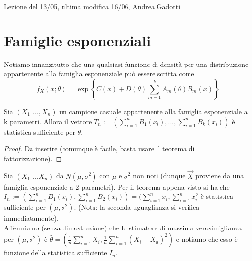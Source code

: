 
Lezione del 13/05, ultima modifica 16/06, Andrea Gadotti

\section{Famiglie esponenziali}

Notiamo innanzitutto che una qualsiasi funzione di densità per una distribuzione appartenente alla famiglia esponenziale può essere scritta come
$$f_X(x;\theta) = \exp \left\lbrace C(x) + D(\theta) \displaystyle \sum_{m=1}^k A_m(\theta) B_m(x) \right\rbrace$$

\begin{teo}

Sia $(X_1,...,X_n)$ un campione casuale appartenente alla famiglia esponenziale a k parametri. Allora il vettore $T_n:=(\sum_{i=1}^n B_1(x_i),...,\sum_{i=1}^n B_k(x_i))$ è statistica sufficiente per $\theta$.

\begin{proof}
Da inserire (comunque è facile, basta usare il teorema di fattorizzazione).
\end{proof}

\end{teo}

\begin{esempio}
Sia $(X_1,...X_n)$ da $N(\mu, \sigma^2)$ con $\mu$ e $\sigma^2$ non noti (dunque $\vec{X}$ proviene da una famiglia esponenziale a 2 parametri). Per il teorema appena visto si ha che $I_n:= (\sum_{i=1}^n B_1(x_i), \sum_{i=1}^n B_2(x_i)) = (\sum_{i=1}^n x_i, \sum_{i=1}^n x_i^2$ è statistica sufficiente per $(\mu, \sigma^2)$. (Nota: la seconda uguaglianza si verifica immediatamente).\\
Affermiamo (senza dimostrazione) che lo stimatore di massima verosimiglianza per $(\mu, \sigma^2)$ è $\hat{\theta} = \left( \frac{1}{n} \sum_{i=1}^n X_i, \frac{1}{n} \sum_{i=1}^n (X_i - \overline{X}_n)^2 \right)$ e notiamo che esso è funzione della statistica sufficiente $I_n$.\\
\\
\end{esempio}